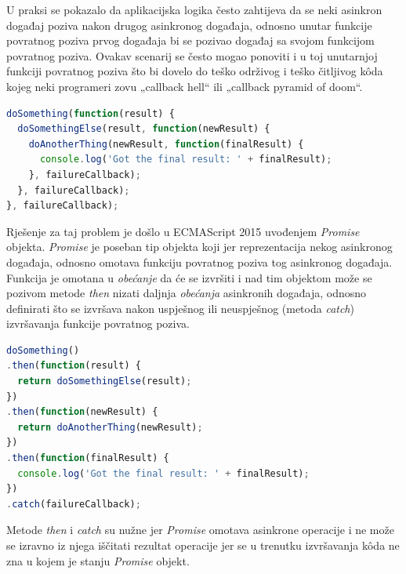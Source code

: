 \documentclass[times, utf8, diplomski, numeric]{fer}
\newcommand{\razmakp}{\vspace{18pt}}
\newcommand{\razmaks}{\vspace{10pt}}
\begin{document}
\razmakp

U praksi se pokazalo da aplikacijska logika često zahtijeva da se neki asinkron događaj poziva nakon drugog asinkronog događaja, odnosno unutar funkcije povratnog poziva prvog događaja bi se pozivao događaj sa svojom funkcijom povratnog poziva.
Ovakav scenarij se često mogao ponoviti i u toj unutarnjoj funkciji povratnog poziva što bi dovelo do teško održivog i teško čitljivog kôda kojeg neki programeri zovu „callback hell“ ili „callback pyramid of doom“.

\razmakp %
\begin{lstlisting}[language=JavaScript, caption={Primjer ugnježđivanja funkcija povratnog poziva}, label={lst:callback}]
doSomething(function(result) {
  doSomethingElse(result, function(newResult) {
    doAnotherThing(newResult, function(finalResult) {
      console.log('Got the final result: ' + finalResult);
    }, failureCallback);
  }, failureCallback);
}, failureCallback);
\end{lstlisting}
\razmaks

Rješenje za taj problem je došlo u ECMAScript 2015 uvođenjem \emph{Promise} objekta.
\emph{Promise} je poseban tip objekta koji jer reprezentacija nekog asinkronog događaja, odnosno omotava funkciju povratnog poziva tog asinkronog događaja.
Funkcija je omotana u \emph{obećanje} da će se izvršiti i nad tim objektom može se pozivom metode \emph{then} nizati daljnja \emph{obećanja} asinkronih događaja, odnosno definirati što se izvršava nakon uspješnog ili neuspješnog (metoda \emph{catch}) izvršavanja funkcije povratnog poziva.

\razmakp %
\begin{lstlisting}[language=JavaScript, caption={Primjer korištenja \emph{Promise} objekta}, label={lst:promise}]
doSomething()
.then(function(result) {
  return doSomethingElse(result);
})
.then(function(newResult) {
  return doAnotherThing(newResult);
})
.then(function(finalResult) {
  console.log('Got the final result: ' + finalResult);
})
.catch(failureCallback);
\end{lstlisting}
\razmaks

Metode \emph{then} i \emph{catch} su nužne jer \emph{Promise} omotava asinkrone operacije i ne može se izravno iz njega iščitati rezultat operacije jer se u trenutku izvršavanja kôda ne zna u kojem je stanju \emph{Promise} objekt.
\end{document}
